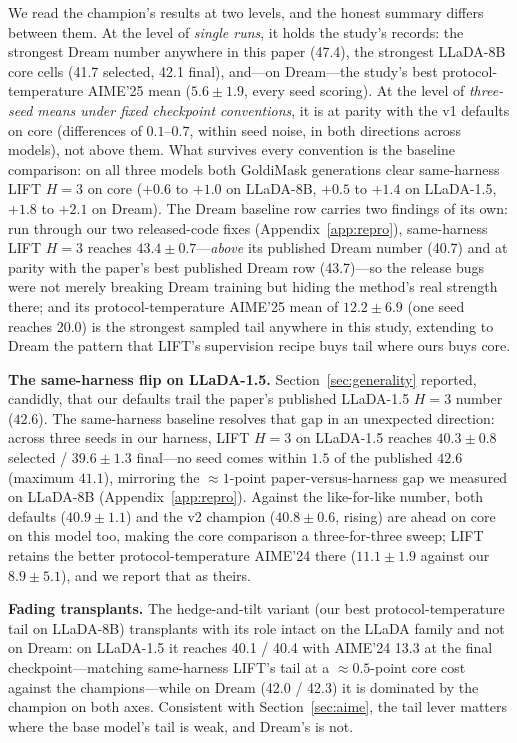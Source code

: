 \documentclass{article} %
\begin{document}
We read the champion's results at two levels, and the honest summary differs between them. At the level of \emph{single runs}, it holds the study's records: the strongest Dream number anywhere in this paper (47.4), the strongest LLaDA-8B core cells (41.7 selected, 42.1 final), and---on Dream---the study's best protocol-temperature AIME'25 mean ($5.6 \pm 1.9$, every seed scoring). At the level of \emph{three-seed means under fixed checkpoint conventions}, it is at parity with the v1 defaults on core (differences of $0.1$--$0.7$, within seed noise, in both directions across models), not above them. What survives every convention is the baseline comparison: on all three models both GoldiMask generations clear same-harness LIFT $H{=}3$ on core ($+0.6$ to $+1.0$ on LLaDA-8B, $+0.5$ to $+1.4$ on LLaDA-1.5, $+1.8$ to $+2.1$ on Dream). The Dream baseline row carries two findings of its own: run through our two released-code fixes (Appendix~\ref{app:repro}), same-harness LIFT $H{=}3$ reaches $43.4 \pm 0.7$---\emph{above} its published Dream number (40.7) and at parity with the paper's best published Dream row (43.7)---so the release bugs were not merely breaking Dream training but hiding the method's real strength there; and its protocol-temperature AIME'25 mean of $12.2 \pm 6.9$ (one seed reaches 20.0) is the strongest sampled tail anywhere in this study, extending to Dream the pattern that LIFT's supervision recipe buys tail where ours buys core.

\textbf{The same-harness flip on LLaDA-1.5.} Section~\ref{sec:generality} reported, candidly, that our defaults trail the paper's published LLaDA-1.5 $H{=}3$ number ($42.6$). The same-harness baseline resolves that gap in an unexpected direction: across three seeds in our harness, LIFT $H{=}3$ on LLaDA-1.5 reaches $40.3 \pm 0.8$ selected / $39.6 \pm 1.3$ final---no seed comes within $1.5$ of the published $42.6$ (maximum $41.1$), mirroring the $\approx 1$-point paper-versus-harness gap we measured on LLaDA-8B (Appendix~\ref{app:repro}). Against the like-for-like number, both defaults ($40.9 \pm 1.1$) and the v2 champion ($40.8 \pm 0.6$, rising) are ahead on core on this model too, making the core comparison a three-for-three sweep; LIFT retains the better protocol-temperature AIME'24 there ($11.1 \pm 1.9$ against our $8.9 \pm 5.1$), and we report that as theirs.

\textbf{Fading transplants.} The hedge-and-tilt variant (our best protocol-temperature tail on LLaDA-8B) transplants with its role intact on the LLaDA family and not on Dream: on LLaDA-1.5 it reaches 40.1 / 40.4 with AIME'24 13.3 at the final checkpoint---matching same-harness LIFT's tail at a $\approx 0.5$-point core cost against the champions---while on Dream (42.0 / 42.3) it is dominated by the champion on both axes. Consistent with Section~\ref{sec:aime}, the tail lever matters where the base model's tail is weak, and Dream's is not.
\end{document}
